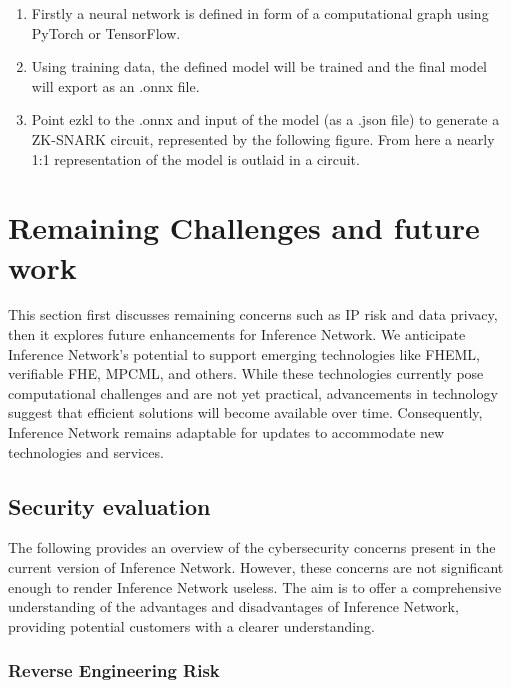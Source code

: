 \documentclass[conference]{IEEEtran}
\begin{document}
\begin{enumerate}

    \item 	Firstly a neural network is defined in form of a computational graph using PyTorch or TensorFlow.

    \item	Using training data, the defined model will be trained and the final model will export as an .onnx file.

    \item	Point ezkl to the .onnx and input of the model (as a .json file) to generate a ZK-SNARK circuit, represented by the following figure. From here a nearly 1:1 representation of the model is outlaid in a circuit.

\end{enumerate}


\section{Remaining Challenges and future work}

This section first discusses remaining concerns such as IP risk and data privacy, then it explores future enhancements for Inference Network. We anticipate Inference Network's potential to support emerging technologies like FHEML, verifiable FHE, MPCML, and others. While these technologies currently pose computational challenges and are not yet practical, advancements in technology suggest that efficient solutions will become available over time. Consequently, Inference Network remains adaptable for updates to accommodate new technologies and services.

\subsection{Security evaluation}

The following provides an overview of the cybersecurity concerns present in the current version of Inference Network. However, these concerns are not significant enough to render Inference Network useless. The aim is to offer a comprehensive understanding of the advantages and disadvantages of Inference Network, providing potential customers with a clearer understanding.

\subsubsection{Reverse Engineering Risk}
\end{document}
